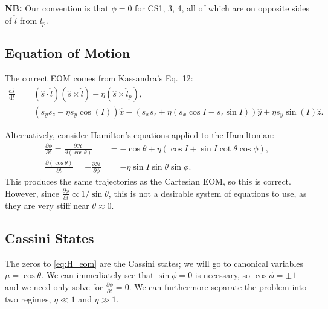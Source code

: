 \documentclass[11pt,
        usenames, %
        dvipsnames %
    ]{article}
\newcommand*{\rd}[2]{\frac{\mathrm{d}#1}{\mathrm{d}#2}}
\newcommand*{\pd}[2]{\frac{\partial#1}{\partial#2}}
\newcommand*{\p}[1]{\left(#1\right)}
\begin{document}
\textbf{NB:} Our convention is that $\phi = 0$ for CS1, 3, 4, all of which are
on opposite sides of $\hat{l}$ from $\hat{l}_p$.

\subsection{Equation of Motion}

The correct EOM comes from Kassandra's Eq.\ 12:
\begin{align*}
    \rd{\hat{s}}{t} &=
        \p{\hat{s} \cdot \hat{l}}\p{\hat{s} \times \hat{l}}
            -\eta\p{\hat{s} \times \hat{l}_p},\\
        &= \p{s_ys_z - \eta s_y\cos(I)}\hat{x}
            - \p{s_xs_z + \eta \p{s_x\cos I - s_z\sin I}}\hat{y}
            + \eta s_y \sin(I)\hat{z}.
\end{align*}

Alternatively, consider Hamilton's equations applied to the Hamiltonian:
\begin{align}
    \pd{\phi}{t} = \pd{\mathcal{H}}{(\cos\theta)}
        &= -\cos\theta + \eta\p{\cos I + \sin I \cot \theta \cos \phi},\\
    \pd{(\cos \theta)}{t} = -\pd{\mathcal{H}}{\phi}
        &= -\eta \sin I \sin \theta \sin \phi.\label{eq:H_eom}
\end{align}
This produces the same trajectories as the Cartesian EOM, so this is correct.
However, since $\pd{\phi}{t} \propto 1/\sin\theta$, this is not a desirable
system of equations to use, as they are very stiff near $\theta \approx 0$.

\subsection{Cassini States}

The zeros to \autoref{eq:H_eom} are the Cassini states; we will go to canonical
variables $\mu = \cos\theta$. We can immediately see that $\sin\phi = 0$ is
necessary, so $\cos \phi = \pm 1$ and we need only solve for $\pd{\phi}{t} = 0$.
We can furthermore separate the problem into two regimes, $\eta \ll 1$ and $\eta
\gg 1$.
\end{document}
